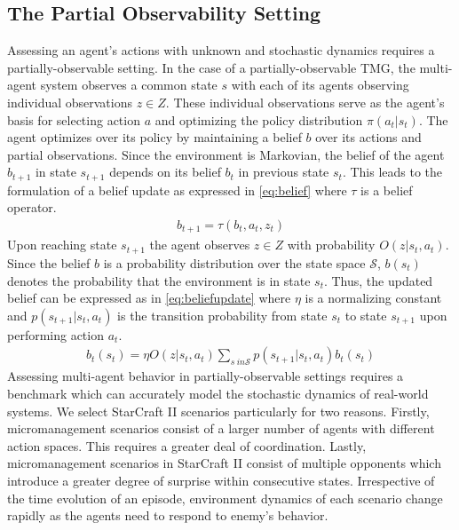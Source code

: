 \documentclass{article}
\begin{document}
\begin{multicols}{2}
\subsection{The Partial Observability Setting}
Assessing an agent's actions with unknown and stochastic dynamics requires a partially-observable setting. In the case of a partially-observable TMG, the multi-agent system observes a common state $s$ with each of its agents observing individual observations $z \in Z$. These individual observations serve as the agent's basis for selecting action $a$ and optimizing the policy distribution $\pi(a_{t}|s_{t})$. The agent optimizes over its policy by maintaining a belief $b$ over its actions and partial observations. Since the environment is Markovian, the belief of the agent $b_{t+1}$ in state $s_{t+1}$ depends on its belief $b_{t}$ in previous state $s_{t}$. This leads to the formulation of a belief update as expressed in \autoref{eq:belief} where $\tau$ is a belief operator.
\begin{gather}
  b_{t+1} = \tau(b_{t},a_{t},z_{t}) \label{eq:belief}
\end{gather}
Upon reaching state $s_{t+1}$ the agent observes $z \in Z$ with probability $O(z|s_{t},a_{t})$. Since the belief $b$ is a probability distribution over the state space $\mathcal{S}$, $b(s_{t})$ denotes the probability that the environment is in state $s_{t}$. Thus, the updated belief can be expressed as in \autoref{eq:beliefupdate} where $\eta$ is a normalizing constant and $p(s_{t+1}|s_{t},a_{t})$ is the transition probability from state $s_{t}$ to state $s_{t+1}$ upon performing action $a_{t}$.
\begin{gather}
  b_{t}(s_{t}) = \eta O(z|s_{t},a_{t})\sum_{s\ in \mathcal{S}}p(s_{t+1}|s_{t},a_{t})b_{t}(s_{t}) \label{eq:beliefupdate}
\end{gather}
Assessing multi-agent behavior in partially-observable settings requires a benchmark which can accurately model the stochastic dynamics of real-world systems. We select StarCraft II \cite{smac} scenarios particularly for two reasons. Firstly, micromanagement scenarios consist of a larger number of agents with different action spaces. This requires a greater deal of coordination. Lastly, micromanagement scenarios in StarCraft II consist of multiple opponents which introduce a greater degree of surprise within consecutive states. Irrespective of the time evolution of an episode, environment dynamics of each scenario change rapidly as the agents need to respond to enemy's behavior. 


\end{multicols}
\end{document}
